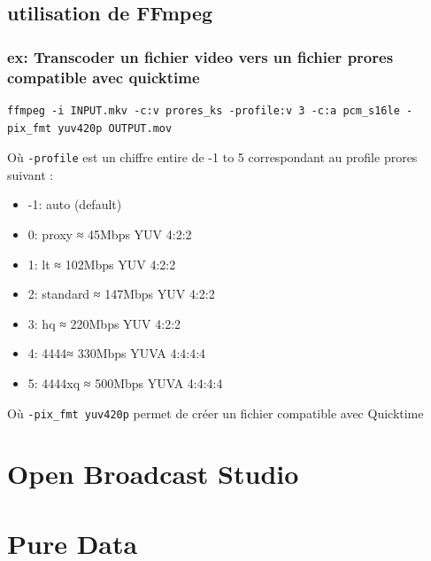 \documentclass[
]{book}
\providecommand{\tightlist}{%
  \setlength{\itemsep}{0pt}\setlength{\parskip}{0pt}}
\begin{document}
\hypertarget{utilisation-de-ffmpeg}{%
\section{utilisation de FFmpeg}\label{utilisation-de-ffmpeg}}

\hypertarget{ex-transcoder-un-fichier-video-vers-un-fichier-prores-compatible-avec-quicktime}{%
\subsection{ex: Transcoder un fichier video vers un fichier prores compatible avec quicktime}\label{ex-transcoder-un-fichier-video-vers-un-fichier-prores-compatible-avec-quicktime}}

\begin{verbatim}
ffmpeg -i INPUT.mkv -c:v prores_ks -profile:v 3 -c:a pcm_s16le -pix_fmt yuv420p OUTPUT.mov
\end{verbatim}

Où \texttt{-profile} est un chiffre entire de -1 to 5 correspondant au profile prores suivant :

\begin{itemize}
\tightlist
\item
  -1: auto (default)
\item
  0: proxy ≈ 45Mbps YUV 4:2:2
\item
  1: lt ≈ 102Mbps YUV 4:2:2
\item
  2: standard ≈ 147Mbps YUV 4:2:2
\item
  3: hq ≈ 220Mbps YUV 4:2:2
\item
  4: 4444≈ 330Mbps YUVA 4:4:4:4
\item
  5: 4444xq ≈ 500Mbps YUVA 4:4:4:4
\end{itemize}

Où \texttt{-pix\_fmt\ yuv420p} permet de créer un fichier compatible avec Quicktime

\hypertarget{obs}{%
\chapter{Open Broadcast Studio}\label{obs}}

\hypertarget{pure-data}{%
\chapter{Pure Data}\label{pure-data}}

  
\end{document}
